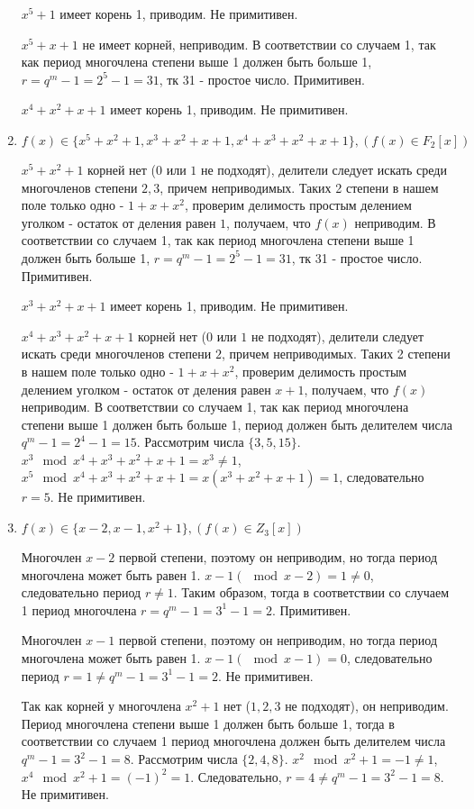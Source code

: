 \documentclass[utf8x, 14pt]{G7-32} %
\begin{document}
\begin{enumerate}
    $x^5+1$ имеет корень 1, приводим. Не примитивен.
    
    $x^5+x+1$ не имеет корней, неприводим. В соответствии со случаем 1, так как период многочлена степени выше 1 должен быть больше 1, $r = q^m -1 = 2^5 - 1 = 31$, тк 31 - простое число. Примитивен.
    
    $x^4+x^2+x+1$ имеет корень 1, приводим. Не примитивен.

    \item $f(x)\in\{x^5+x^2+1, x^3+x^2+x+1, x^4+x^3+x^2+x+1\}, (f(x)\in F_2[x])$
    
    $x^5+x^2+1$ корней нет ($0$ или $1$ не подходят), делители следует искать среди многочленов степени $2,3$, причем неприводимых. Таких 2 степени в нашем поле только одно - $1 + x + x^2$, проверим делимость простым делением уголком - остаток от деления равен $1$, получаем, что $f(x)$ неприводим. В соответствии со случаем 1, так как период многочлена степени выше 1 должен быть больше 1, $r = q^m -1 = 2^5 - 1 = 31$, тк 31 - простое число. Примитивен.

    $x^3+x^2+x+1$ имеет корень 1, приводим. Не примитивен.
    
    $ x^4+x^3+x^2+x+1 $ корней нет ($0$ или $1$ не подходят), делители следует искать среди многочленов степени $2$, причем неприводимых. Таких 2 степени в нашем поле только одно - $1 + x + x^2$, проверим делимость простым делением уголком - остаток от деления равен $x+1$, получаем, что $f(x)$ неприводим. В соответствии со случаем 1, так как период многочлена степени выше 1 должен быть больше 1, период должен быть делителем числа $ q^m -1 = 2^4 - 1 = 15$. Рассмотрим числа $\{3, 5, 15\}$. $x^3 \mod x^4+x^3+x^2+x+1 = x^3 \neq 1$, $x^5 \mod x^4+x^3+x^2+x+1 = x(x^3+x^2+x+1) = 1$, следовательно $r= 5$. Не примитивен.
    
    \item $f(x)\in\{x-2, x-1, x^2+1\}, (f(x)\in Z_3[x])$
    
    Многочлен $x-2$ первой степени, поэтому он неприводим, но тогда период многочлена может быть равен 1. $x - 1 (\mod{x - 2}) = 1 \neq 0$, следовательно период $r \neq 1$. Таким образом, тогда в соответствии со случаем 1 период многочлена $r = q^m - 1 = 3^1 -1 = 2$. Примитивен.
    
    Многочлен $x-1$ первой степени, поэтому он неприводим, но тогда период многочлена может быть равен 1. $x - 1 (\mod{x - 1}) = 0$, следовательно период $r = 1 \neq q^m - 1 = 3^1 -1 = 2$. Не примитивен.
    
    Так как корней у многочлена $x^2+1$ нет ($1,2,3$ не подходят), он неприводим. Период многочлена степени выше 1 должен быть больше 1, тогда в соответствии со случаем 1 период многочлена должен быть делителем числа $q^m -1 = 3^2 -1 = 8$. Рассмотрим числа $\{2, 4, 8\}$. $x^2 \mod x^2 + 1 = -1 \neq 1$,  $x^4 \mod x^2 + 1 = (-1)^2 = 1$. Следовательно, $r=4 \neq q^m -1 = 3^2 -1 = 8$. Не примитивен.


\end{enumerate}
\end{document}
